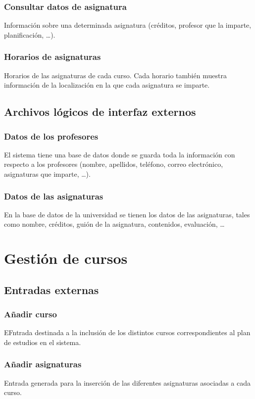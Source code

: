 \documentclass[11pt,a4paper,spanish,twoside]{book}
\begin{document}
\subsubsection{Consultar datos de asignatura} 
Información sobre una determinada asignatura (créditos, profesor que la
imparte, planificación, \dots).

\subsubsection{Horarios de asignaturas}
Horarios de las asignaturas de cada curso. Cada horario
también muestra información de la localización en la que cada asignatura se
imparte. 

\subsection{Archivos lógicos de interfaz externos}
\subsubsection{Datos de los profesores}
El sistema tiene una base de datos donde se guarda toda la información con
respecto a los profesores (nombre, apellidos, teléfono, correo electrónico,
asignaturas que imparte, \dots).

\subsubsection{Datos de las asignaturas}
En la base de datos de la universidad se tienen los datos de las asignaturas,
tales como nombre, créditos, guión de la asignatura, contenidos, evaluación,
\dots 


\section{Gestión de cursos}
\subsection{Entradas externas}
\subsubsection{Añadir curso}
EFntrada destinada a la inclusión de los distintos cursos correspondientes al
plan de estudios en el sistema.

\subsubsection{Añadir asignaturas}
Entrada generada para la inserción de las diferentes asignaturas asociadas a
cada curso.
\end{document}
